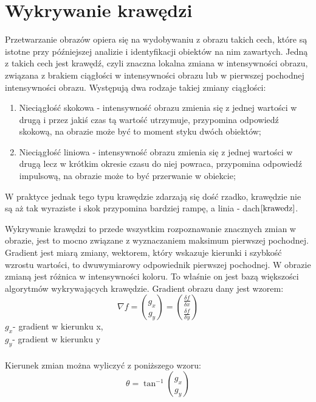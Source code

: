 \documentclass[eng,oneside]{mgr}
\begin{document}
\section{Wykrywanie krawędzi}
Przetwarzanie obrazów opiera się na wydobywaniu z obrazu takich cech, które są istotne przy późniejszej analizie i identyfikacji obiektów na nim zawartych. Jedną z takich cech jest krawędź, czyli znaczna lokalna zmiana w intensywności obrazu, związana z brakiem ciągłości w intensywności obrazu lub w pierwszej pochodnej intensywności obrazu. Występują dwa rodzaje takiej zmiany ciągłości:
\begin{enumerate}
\item Nieciągłość skokowa - intensywność obrazu zmienia się z jednej wartości w drugą i przez jakiś czas tą wartość utrzymuje, przypomina odpowiedź skokową, na obrazie może być to moment styku dwóch obiektów;
\item Nieciągłość liniowa - intensywność obrazu zmienia się z jednej wartości w drugą lecz w krótkim okresie czasu do niej powraca, przypomina odpowiedź impulsową, na obrazie może to być przerwanie w obiekcie; 
\end{enumerate}
W praktyce jednak tego typu krawędzie zdarzają się dość rzadko, krawędzie nie są aż tak wyraziste i skok przypomina bardziej rampę, a linia - dach$\cite{krawedz}$.

Wykrywanie krawędzi to przede wszystkim rozpoznawanie znacznych zmian w obrazie, jest to mocno związane z wyznaczaniem maksimum pierwszej pochodnej. 
Gradient jest miarą zmiany, wektorem, który wskazuje kierunki i szybkość wzrostu wartości, to dwuwymiarowy odpowiednik pierwszej pochodnej. W obrazie zmianą jest różnica w intensywności koloru. To właśnie on jest bazą większości algorytmów wykrywających krawędzie. Gradient obrazu dany jest wzorem:
\begin{equation}
\nabla f = \binom{g_x}{g_y} = \binom{\frac{\delta f}{\delta x}}{\frac{\delta f}{\delta y}}
\end{equation} 
$g_x $- gradient w kierunku x,
\\
$g_y $- gradient w kierunku y
 \\
 \\
Kierunek zmian można wyliczyć z poniższego wzoru:
\begin{equation}
\theta = \tan^{-1} \binom{g_x}{g_y}
\end{equation}
\end{document}
